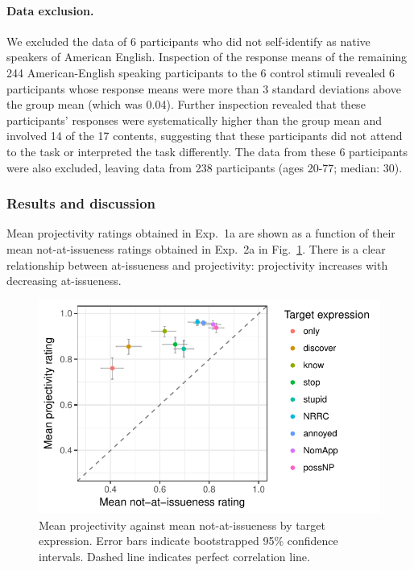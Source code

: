 \documentclass[11pt,fleqn]{article}
\newcommand{\6}{\mbox{$[\hspace*{-.6mm}[$}}
\newcommand{\9}{\mbox{$]\hspace*{-.6mm}]$}}
\newcommand{\figref}[1]{Fig.~\ref{#1}}
\begin{document}
\paragraph{Data exclusion.} We excluded the data of 6 participants who did not self-identify as native speakers of American English. Inspection of the response means of the remaining 244 American-English speaking participants to the 6 control stimuli revealed 6 participants whose response means were more than 3 standard deviations above the group mean (which was 0.04). Further inspection revealed that these participants' responses were systematically higher than the group mean and involved 14 of the 17 contents, suggesting that these participants did not attend to the task or interpreted the task differently. The data from these 6 participants were also excluded, leaving data from 238 participants (ages 20-77; median: 30).


\subsubsection{Results and discussion}

Mean projectivity ratings obtained in Exp.~1a are shown as a function of their mean not-at-issueness ratings obtained in Exp.~2a in \figref{fig:f-proj-ai-2a}. There is a clear relationship between at-issueness and projectivity: projectivity increases with decreasing at-issueness.

\begin{figure}[!h]

\begin{center}
\includegraphics[width=12cm]{../results/exp2a/graphs/ai-proj-bytrigger}
\end{center}

\caption{Mean projectivity against mean not-at-issueness by target expression. Error bars indicate bootstrapped 95\% confidence intervals. Dashed line indicates perfect correlation line.}
\label{fig:f-proj-ai-2a}
\end{figure}
\end{document}
